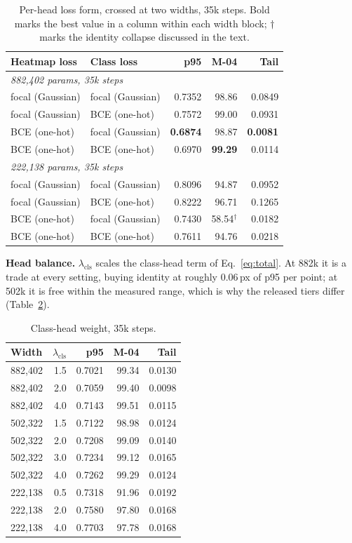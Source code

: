 \documentclass[10pt,twocolumn,letterpaper]{article}
\begin{document}
\begin{table}[h]
\centering\small
\begin{tabular}{llrrr}
\toprule
Heatmap loss & Class loss & p95 & M-04 & Tail \\
\midrule
\multicolumn{5}{l}{\emph{882,402 params, 35k steps}}\\
focal (Gaussian) & focal (Gaussian) & 0.7352 & 98.86 & 0.0849 \\
focal (Gaussian) & BCE (one-hot) & 0.7572 & 99.00 & 0.0931 \\
BCE (one-hot) & focal (Gaussian) & \textbf{0.6874} & 98.87 & \textbf{0.0081} \\
BCE (one-hot) & BCE (one-hot) & 0.6970 & \textbf{99.29} & 0.0114 \\
\midrule
\multicolumn{5}{l}{\emph{222,138 params, 35k steps}}\\
focal (Gaussian) & focal (Gaussian) & 0.8096 & 94.87 & 0.0952 \\
focal (Gaussian) & BCE (one-hot) & 0.8222 & 96.71 & 0.1265 \\
BCE (one-hot) & focal (Gaussian) & 0.7430 & 58.54$^\dagger$ & 0.0182 \\
BCE (one-hot) & BCE (one-hot) & 0.7611 & 94.76 & 0.0218 \\
\bottomrule
\end{tabular}
\caption{Per-head loss form, crossed at two widths, 35k steps. Bold marks the best value in a
column within each width block; $\dagger$ marks the identity collapse discussed in the text.}
\label{tab:ab_perhead}
\end{table}

\textbf{Head balance.} $\lambda_{\mathrm{cls}}$ scales the class-head term of Eq.~\ref{eq:total}.
At 882k it is a trade at every setting, buying identity at roughly 0.06\,px of p95 per point; at
502k it is free within the measured range, which is why the released tiers differ
(Table~\ref{tab:ab_lambda}).

\begin{table}[h]
\centering\small
\begin{tabular}{lrrrr}
\toprule
Width & $\lambda_{\mathrm{cls}}$ & p95 & M-04 & Tail \\
\midrule
882,402 & 1.5 & 0.7021 & 99.34 & 0.0130 \\
882,402 & 2.0 & 0.7059 & 99.40 & 0.0098 \\
882,402 & 4.0 & 0.7143 & 99.51 & 0.0115 \\
\midrule
502,322 & 1.5 & 0.7122 & 98.98 & 0.0124 \\
502,322 & 2.0 & 0.7208 & 99.09 & 0.0140 \\
502,322 & 3.0 & 0.7234 & 99.12 & 0.0165 \\
502,322 & 4.0 & 0.7262 & 99.29 & 0.0124 \\
\midrule
222,138 & 0.5 & 0.7318 & 91.96 & 0.0192 \\
222,138 & 2.0 & 0.7580 & 97.80 & 0.0168 \\
222,138 & 4.0 & 0.7703 & 97.78 & 0.0168 \\
\bottomrule
\end{tabular}
\caption{Class-head weight, 35k steps.}
\label{tab:ab_lambda}
\end{table}
\end{document}
